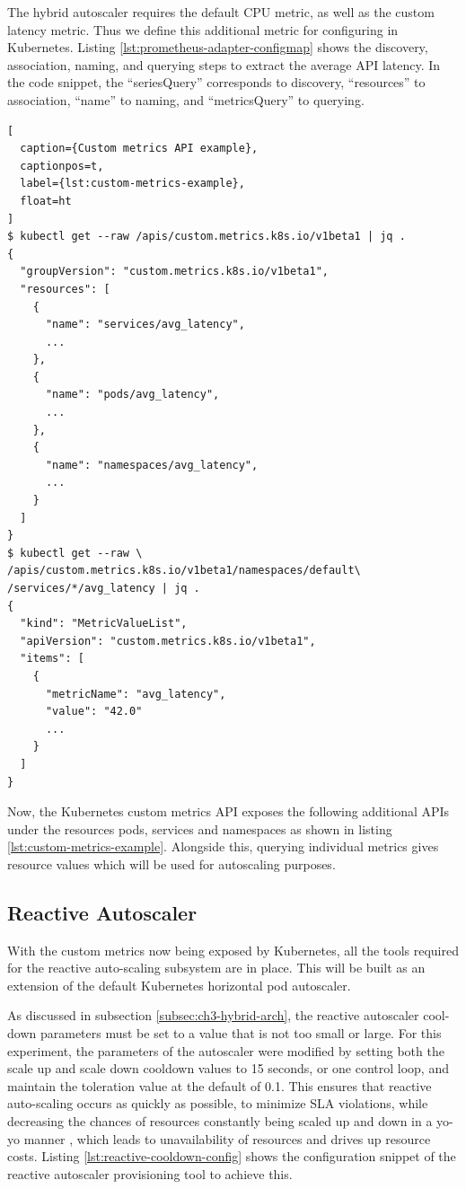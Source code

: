 The hybrid autoscaler requires the default CPU metric, as well as the custom latency metric. Thus we define this additional metric for configuring in Kubernetes. Listing \ref{lst:prometheus-adapter-configmap} shows the discovery, association, naming, and querying steps to extract the average API latency. In the code snippet, the ``seriesQuery'' corresponds to discovery, ``resources'' to association, ``name'' to naming, and ``metricsQuery'' to querying.

\begin{lstlisting}[
  caption={Custom metrics API example},
  captionpos=t,
  label={lst:custom-metrics-example},
  float=ht
]
$ kubectl get --raw /apis/custom.metrics.k8s.io/v1beta1 | jq .
{
  "groupVersion": "custom.metrics.k8s.io/v1beta1",
  "resources": [
    {
      "name": "services/avg_latency",
      ...
    },
    {
      "name": "pods/avg_latency",
      ...
    },
    {
      "name": "namespaces/avg_latency",
      ...
    }
  ]
}
$ kubectl get --raw \
/apis/custom.metrics.k8s.io/v1beta1/namespaces/default\
/services/*/avg_latency | jq .
{
  "kind": "MetricValueList",
  "apiVersion": "custom.metrics.k8s.io/v1beta1",
  "items": [
    {
      "metricName": "avg_latency",
      "value": "42.0"
      ...
    }
  ]
}
\end{lstlisting}

Now, the Kubernetes custom metrics API exposes the following additional APIs under the resources pods, services and namespaces as shown in listing \ref{lst:custom-metrics-example}. Alongside this, querying individual metrics gives resource values which will be used for autoscaling purposes.

\subsection{Reactive Autoscaler}
\label{subsec:reactive-auto-subsection}

With the custom metrics now being exposed by Kubernetes, all the tools required for the reactive auto-scaling subsystem are in place. This will be built as an extension of the default Kubernetes horizontal pod autoscaler.\par

As discussed in subsection \ref{subsec:ch3-hybrid-arch}, the reactive autoscaler cool-down parameters must be set to a value that is not too small or large. For this experiment, the parameters of the autoscaler were modified by setting both the scale up and scale down cooldown values to 15 seconds, or one control loop, and maintain the toleration value at the default of 0.1. This ensures that reactive auto-scaling occurs as quickly as possible, to minimize SLA violations, while decreasing the chances of resources constantly being scaled up and down in a yo-yo manner \cite{sides2015yo}, which leads to unavailability of resources and drives up resource costs. Listing \ref{lst:reactive-cooldown-config} shows the configuration snippet of the reactive autoscaler provisioning tool to achieve this.\par

